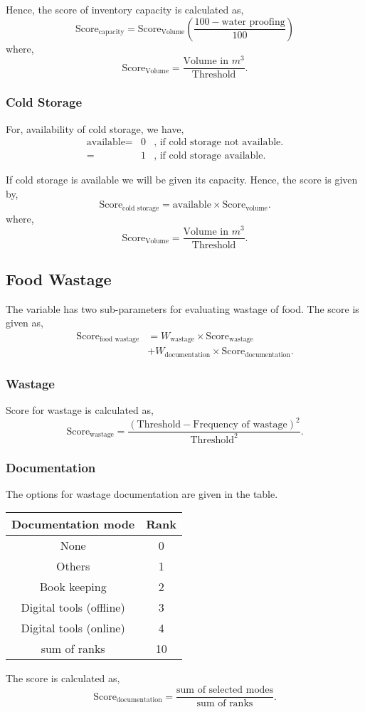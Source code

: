\documentclass[oneside,twocolumn]{article}
\begin{document}
Hence, the score of inventory capacity is calculated as,
\[
\text{Score}_{\text{capacity}} = \text{Score}_{\text{Volume}} ( \dfrac{100 - \text{water proofing}}{100} )
\]
where,
\[
\text{Score}_{\text{Volume}} = \dfrac{\text{Volume in } m^{3}}{\text{Threshold}}.
\]

\subsubsection{Cold Storage}
For, availability of cold storage, we have,
\begin{align*}
  \text{available} =& 0 &, \text{ if cold storage not available.} \\
  =& 1 &, \text{ if cold storage available.}
\end{align*}

If cold storage is available we will be given its capacity. Hence, the score is given by,
\[
\text{Score}_{\text{cold storage}} = \text{available} \times \text{Score}_{\text{volume}}.
\]
where,
\[
\text{Score}_{\text{Volume}} = \dfrac{\text{Volume in } m^{3}}{\text{Threshold}}.
\]

\subsection{Food Wastage}
The variable has two sub-parameters for evaluating wastage of food. The score is given as,
\begin{align*}
\text{Score}_{\text{food wastage}} &= W_{\text{wastage}} \times \text{Score}_{\text{wastage}} \\
&+ W_{\text{documentation}} \times \text{Score}_{\text{documentation}}.
\end{align*}
\subsubsection{Wastage}
Score for wastage is calculated as,
\[
\text{Score}_{\text{wastage}} = \dfrac{(\text{Threshold} - \text{Frequency of wastage})^2}{\text{Threshold}^2}.
\]

\subsubsection{Documentation}
The options for wastage documentation are given in the table.
\begin{center}
  \begin{tabular}{c | c}
    \hline
    Documentation mode & Rank \\ \hline
    None & 0 \\
    Others & 1 \\
    Book keeping & 2 \\
    Digital tools (offline) & 3 \\
    Digital tools (online) & 4 \\ \hline
    sum of ranks & 10 \\ \hline
  \end{tabular}
\end{center}
The score is calculated as,
\[
\text{Score}_{\text{documentation}} = \dfrac{\text{sum of selected modes}}{\text{sum of ranks}}.
\]
\end{document}
